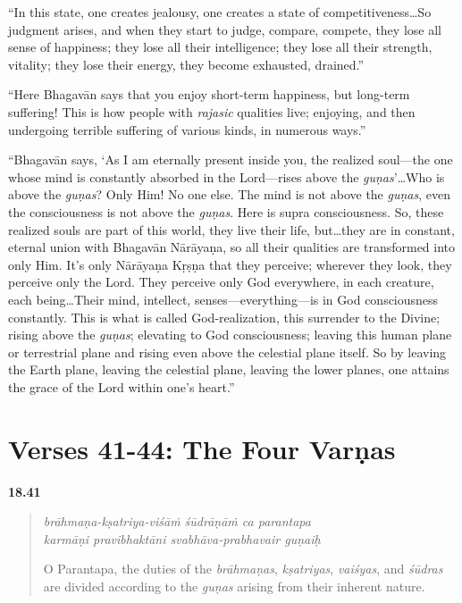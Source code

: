 \enquote{In this state, one creates jealousy, one creates a state of competitiveness\ldots So judgment arises, and when they start to judge, compare, compete, they lose all sense of happiness; they lose all their intelligence; they lose all their strength, vitality; they lose their energy, they become exhausted, drained.}

\enquote{Here Bhagavān says that you enjoy short-term happiness, but long-term suffering! This is how people with \textit{rajasic} qualities live; enjoying, and then undergoing terrible suffering of various kinds, in numerous ways.}

\enquote{Bhagavān says, \enquote{As I am eternally present inside you, the realized soul---the one whose mind is constantly absorbed in the Lord---rises above the \textit{guṇas}}\ldots Who is above the \textit{guṇas}? Only Him! No one else. The mind is not above the \textit{guṇas}, even the consciousness is not above the \textit{guṇas}. Here is supra consciousness. So, these realized souls are part of this world, they live their life, but\ldots they are in constant, eternal union with Bhagavān Nārāyaṇa, so all their qualities are transformed into only Him. It’s only Nārāyaṇa Kṛṣṇa that they perceive; wherever they look, they perceive only the Lord. They perceive only God everywhere, in each creature, each being\ldots Their mind, intellect, senses---everything---is in God consciousness constantly. This is what is called God-realization, this surrender to the Divine; rising above the \textit{guṇas}; elevating to God consciousness; leaving this human plane or terrestrial plane and rising even above the celestial plane itself. So by leaving the Earth plane, leaving the celestial plane, leaving the lower planes, one attains the grace of the Lord within one’s heart.}

\section{Verses 41-44: The Four Varṇas}\label{sec-verses-41-44-the-four-varnas}


\par\noindent\textbf{18.41}\par
\begin{verse}
\textit{brāhmaṇa-kṣatriya-viśāṁ śūdrāṇāṁ ca parantapa} \\
\textit{karmāṇi pravibhaktāni svabhāva-prabhavair guṇaiḥ}

\noindent O Parantapa, the duties of the \textit{brāhmaṇas}, \textit{kṣatriyas}, \textit{vaiśyas}, and \textit{śūdras} are divided according to the \textit{guṇas} arising from their inherent nature.
\end{verse}
\par



